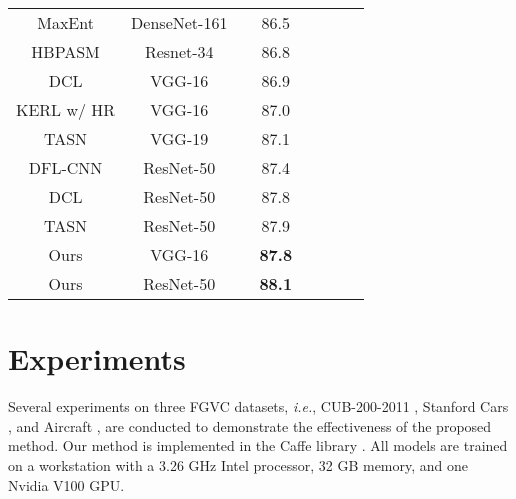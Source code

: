 \documentclass[10pt,twocolumn,letterpaper]{article}
\def\ie{{\em i.e.}}
\begin{document}
\begin{table}[t]
{\begin{tabular}{ccccpppp}
    	   MaxEnt \cite{DBLP:conf/nips/DubeyGRN18}    & DenseNet-161 &    &      86.5       \\
    	            HBPASM \cite{8805063}             &  Resnet-34   &    &      86.8       \\
    	          DCL \cite{Chen_2019_CVPR}           &    VGG-16    &    &      86.9       \\
    	KERL w/ HR \cite{DBLP:conf/ijcai/ChenLCWL18}  &    VGG-16    &    &      87.0       \\
    	TASN \cite{DBLP:journals/corr/abs-1903-06150} &    VGG-19    &    &      87.1       \\
    	   DFL-CNN \cite{DBLP:conf/cvpr/WangMD18}     &  ResNet-50   &    &      87.4       \\
    	          DCL \cite{Chen_2019_CVPR}           &  ResNet-50   &    &      87.8       \\
    	TASN \cite{DBLP:journals/corr/abs-1903-06150} &  ResNet-50   &    &      87.9       \\
    	                    Ours                      &    VGG-16    &    &  \textbf{87.8}  \\
    	                    Ours                      &  ResNet-50   &    &  \textbf{88.1}  \\ \bottomrule
    \end{tabular}}
    \vspace{-2mm}
\end{table}

\section{Experiments}
Several experiments on three FGVC datasets, \ie, CUB-200-2011 \cite{report-wahcub_200_2011}, Stanford Cars \cite{DBLP:conf/iccvw/Krause0DF13}, and Aircraft \cite{maji13fine-grained}, are conducted to demonstrate the effectiveness of the proposed method. Our method is implemented in the Caffe library \cite{DBLP:journals/corr/JiaSDKLGGD14}. All models are trained on a workstation with a 3.26 GHz Intel processor, 32 GB memory, and one Nvidia V100 GPU.
\end{document}
